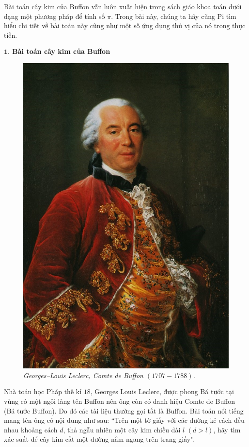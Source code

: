 \begin{multicols}{2}
	Bài toán cây kim của Buffon vẫn luôn xuất hiện trong sách giáo khoa toán dưới dạng một phương pháp để tính số $\pi$. Trong bài này, chúng ta hãy cũng Pi tìm hiểu chi tiết về bài toán này cũng như một số ứng dụng thú vị của nó trong thực tiễn.
	
	\vskip 0.1cm
	\textbf{\color{toanhocdoisong}$\pmb{1.}$ Bài toán cây kim của Buffon}
	\begin{figure}[H]
		\vspace*{-5pt}
		\centering
		\captionsetup{labelformat= empty, justification=centering}
		\includegraphics[width=0.6\linewidth]{1}
		\caption{\small\textit{\color{toanhocdoisong}Georges--Louis Leclerc, Comte de Buffon $(1707-1788)$.}}
		\vspace*{-10pt}
	\end{figure}
	Nhà toán học Pháp thế kỉ $18$, Georges Louis Leclerc, được phong Bá tước tại vùng có một ngôi làng tên Buffon nên ông còn có danh hiệu Comte de Buffon (Bá tước Buffon). Do đó các tài liệu thường gọi tắt là Buffon. Bài toán nổi tiếng mang tên ông có nội dung như sau:
	\vskip 0.1cm
	``Trên một tờ giấy với các đường kẻ cách đều nhau khoảng cách $d$, thả ngẫu nhiên một cây kim chiều dài $l$ $(d>l)$, hãy tìm xác suất để cây kim cắt một đường nằm ngang trên trang giấy".
	\begin{figure}[H]
		\vspace*{-5pt}
		\centering
		\captionsetup{labelformat= empty, justification=centering}

\end{figure}
\end{multicols}
